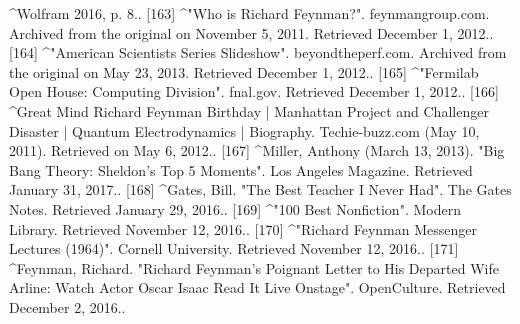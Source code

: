 ^Wolfram 2016, p. 8..
[163]
^"Who is Richard Feynman?". feynmangroup.com. Archived from the original on November 5, 2011. Retrieved December 1, 2012..
[164]
^"American Scientists Series Slideshow". beyondtheperf.com. Archived from the original on May 23, 2013. Retrieved December 1, 2012..
[165]
^"Fermilab Open House: Computing Division". fnal.gov. Retrieved December 1, 2012..
[166]
^Great Mind Richard Feynman Birthday | Manhattan Project and Challenger Disaster | Quantum Electrodynamics | Biography. Techie-buzz.com (May 10, 2011). Retrieved on May 6, 2012..
[167]
^Miller, Anthony (March 13, 2013). "Big Bang Theory: Sheldon's Top 5 Moments". Los Angeles Magazine. Retrieved January 31, 2017..
[168]
^Gates, Bill. "The Best Teacher I Never Had". The Gates Notes. Retrieved January 29, 2016..
[169]
^"100 Best Nonfiction". Modern Library. Retrieved November 12, 2016..
[170]
^"Richard Feynman Messenger Lectures (1964)". Cornell University. Retrieved November 12, 2016..
[171]
^Feynman, Richard. "Richard Feynman's Poignant Letter to His Departed Wife Arline: Watch Actor Oscar Isaac Read It Live Onstage". OpenCulture. Retrieved December 2, 2016..
